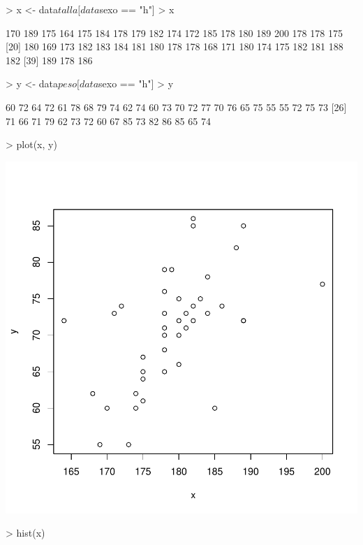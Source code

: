 \documentclass[12pt]{article}
\begin{document}
\begin{Schunk}
\begin{Sinput}
> x <- data$talla[data$sexo == "h"]
> x
\end{Sinput}
\begin{Soutput}
 [1] 170 189 175 164 175 184 178 179 182 174 172 185 178 180 189 200 178 178 175
[20] 180 169 173 182 183 184 181 180 178 178 168 171 180 174 175 182 181 188 182
[39] 189 178 186
\end{Soutput}
\begin{Sinput}
> y <- data$peso[data$sexo == "h"]
> y
\end{Sinput}
\begin{Soutput}
 [1] 60 72 64 72 61 78 68 79 74 62 74 60 73 70 72 77 70 76 65 75 55 55 72 75 73
[26] 71 66 71 79 62 73 72 60 67 85 73 82 86 85 65 74
\end{Soutput}
\end{Schunk}
\begin{Schunk}
\begin{Sinput}
> plot(x, y)
\end{Sinput}
\end{Schunk}
\includegraphics{ensayo-006}
\begin{Schunk}
\begin{Sinput}
> hist(x)
\end{Sinput}
\end{Schunk}
\end{document}
